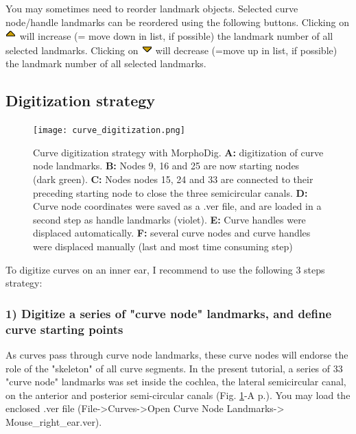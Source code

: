 \documentclass[12pt, a4paper]{book}
\begin{document}
You may sometimes need to reorder landmark objects. 
Selected curve node/handle landmarks can be reordered
using the following buttons. Clicking on \includegraphics[scale=0.7]{../images/06/objects/move_up.png} will increase (= move down in list, if possible) the landmark number of all selected landmarks. Clicking on \includegraphics[scale=0.7]{../images/06/objects/move_down.png} will decrease (=move up in list, if possible) the landmark number of all selected landmarks. 

\subsection{Digitization strategy}
\begin{figure}
  \centering
  \texttt{[image: curve\_digitization.png]} 
	\caption{Curve digitization strategy with MorphoDig. \textbf{A:} digitization of curve node landmarks. \textbf{B:} Nodes 9, 16 and 25 are now starting nodes (dark green). \textbf{C:} Nodes nodes 15, 24 and 33 are connected to their preceding starting node to close the three semicircular canals. \textbf{D:} Curve node coordinates were saved  as a .ver file, and are loaded in a second step as handle landmarks (violet). \textbf{E:} Curve handles were displaced automatically. \textbf{F:} several curve nodes and curve handles were displaced manually (last and most time consuming step)}
\label{curve_digitization}
 \end{figure}
To digitize curves on an inner ear, I recommend to use the following 3 steps strategy:
\subsubsection{1) Digitize a series of "curve node" landmarks, and define curve starting points}
As curves pass through curve node landmarks, these curve nodes will endorse the role of the "skeleton" of all curve segments. In the present tutorial, a series of 33 "curve node" landmarks was set inside the cochlea, the lateral semicircular canal, on the anterior and posterior semi-circular canals (Fig. \ref{curve_digitization}-A p.\pageref{curve_digitization}). You may load the enclosed .ver file (File->Curves->Open Curve Node Landmarks-> Mouse\_right\_ear.ver).\\
\end{document}
